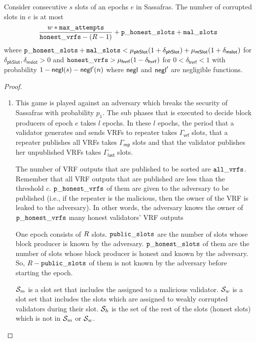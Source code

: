 \begin{theorem}
	Consider consecutive $ s $ slots of an epochs $ e $  in Sassafras. The number of corrupted slots in $ e $ is at most
	$$ \frac{w *\mathtt{max\_attempts}}{\mathtt{honest\_vrfs} - (R-1)} +  \mathtt{p\_honest\_slots} + \mathtt{mal\_slots} $$ 
	 where $ \mathtt{p\_honest\_slots} + \mathtt{mal\_slots} < \mu_{\mathsf{phSlot}}(1+\delta_{\mathsf{phSlot}}) + \mu_{\mathsf{mSlot}} (1 + \delta_{\mathsf{mslot}}) $ for  $ \delta_{\mathsf{phSlot}}, \delta_{\mathsf{mslot}} > 0 $ and $ \mathtt{honest\_vrfs} > \mu_{\mathsf{hvrf}} (1- \delta_{\mathsf{hvrf}}) $ for $ 0<\delta_{\mathsf{hvrf}} <1 $ with probability $ 1- \mathsf{negl}(s) - \mathsf{negl}'(n) $ where $ \mathsf{negl} $ and $\mathsf{negl}'  $ are  negligible functions.
\end{theorem}

\begin{proof}

\begin{enumerate}[label={{Game }}{{\arabic*}}]	
	\item This game is played against an adversary which breaks the security of  Sassafras with probability $ p_1 $. The sub phases that is executed to decide block producers of epoch $ e $ takes $ l $ epochs.	
	 In these $ l $ epochs, the period that a validator generates and sends VRFs to repeater takes $ \Gamma_{\mathsf{vrf}} $ slots, that a repeater publishes all VRFs takes $ \Gamma_{\mathsf{rep}} $ slots and that the validator publishes her unpublished VRFs takes $ \Gamma_{\mathsf{last}} $ slots. 
	 
	 
	
	 The number of VRF outputs that are published to be sorted are $ \mathtt{all\_vrfs} $. Remember that all VRF outputs that are published are less than the threshold $ c $. $ \mathtt{p\_honest\_vrfs} $ of them are given to the adversary to be published (i.e., if the repeater is the malicious, then the owner of the VRF is leaked to the adversary). In other words, the adversary knows the owner of $ \mathtt{p\_honest\_vrfs} $ many honest validators' VRF outputs
	 
	 One epoch consists of $ R  $ slots. $ \mathtt{public\_slots} $ are the number of slots whose block producer is known by the adversary. $ \mathtt{p\_honest\_slots} $ of them are the number of slots whose block producer is honest and known by the adversary. So, $ R  - \mathtt{public\_slots} $ of them is not known by the adversary before starting the epoch.
	 
	 $ \mathcal{S}_m $ is a slot set that includes the assigned to a malicious validator. $ \mathcal{S}_w $ is a slot set that includes the slots which are assigned to weakly corrupted validators during their slot. $ \mathcal{S}_h $ is the set of the rest of the slots (honest slots) which is not in $ \mathcal{S}_m $ or $ \mathcal{S}_w $. 
	  

\end{enumerate}
\end{proof}
